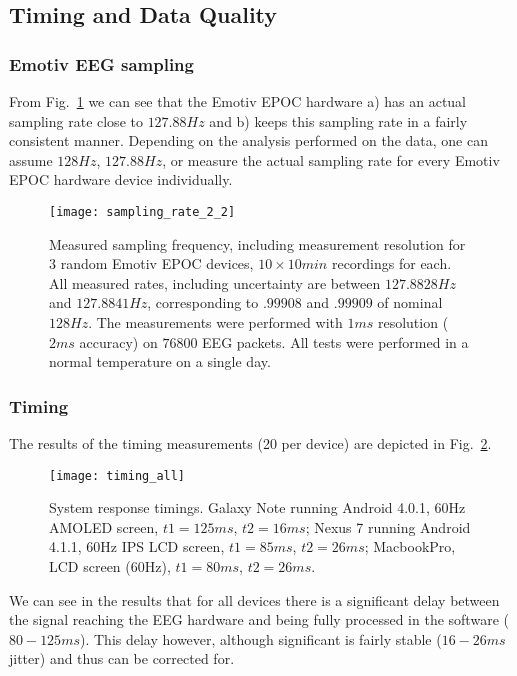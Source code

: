 \documentclass[10pt]{article}
\begin{document}
\subsection{Timing and Data Quality}
\subsubsection{Emotiv EEG sampling}
From Fig.~\ref{figure_sampling} we can see that the Emotiv EPOC hardware a) has an actual sampling rate close to $127.88Hz$ and b) keeps this sampling rate in a fairly consistent manner.  Depending on the analysis performed on the data, one can assume $128Hz$, $127.88Hz$, or measure the actual sampling rate for every Emotiv EPOC hardware device individually.
\begin{figure}[!t]
\centering
\texttt{[image: sampling\_rate\_2\_2]}
\caption{Measured sampling frequency, including measurement resolution for 3 random Emotiv EPOC devices, $10\times 10min$ recordings for each.  All measured rates, including uncertainty are between $127.8828Hz$ and $127.8841Hz$, corresponding to $.99908$ and $.99909$ of nominal $128Hz$. The measurements were performed with $1ms$ resolution ($2ms$ accuracy) on $76800$ EEG packets. All tests were performed in a normal temperature on a single day.}
\label{figure_sampling}
\end{figure}
\subsubsection{Timing}
The results of the timing measurements (20 per device) are depicted in Fig.~\ref{figure_timing_all}.
\begin{figure}[!t]
\centering
\texttt{[image: timing\_all]}
\caption{System response timings. Galaxy Note running Android 4.0.1, 60Hz AMOLED screen, $t1=125ms$, $t2=16ms$; Nexus 7 running Android 4.1.1, 60Hz IPS LCD screen, $t1=85ms$, $t2=26ms$; MacbookPro, LCD screen (60Hz), $t1 = 80ms$, $t2=26ms$.}
\label{figure_timing_all}
\end{figure}
We can see in the results that for all devices there is a significant delay between the signal reaching the EEG hardware and being fully processed in the software ($80-125ms$). This delay however, although significant is fairly stable ($16-26ms$ jitter) and thus can be corrected for.
\end{document}
